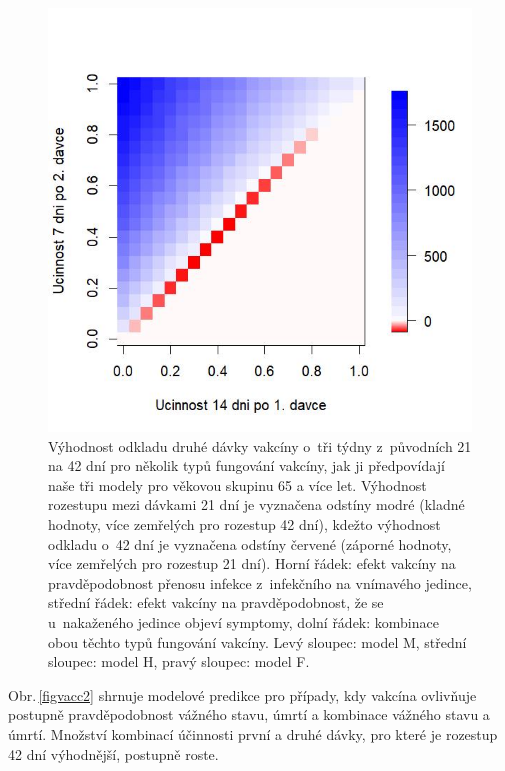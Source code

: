\begin{figure}[ht]
\begin{center}
\begin{minipage}[m]{0.3\linewidth}
		\end{minipage}
		\begin{minipage}[m]{0.3\linewidth}
			\includegraphics[width=\textwidth]{pic/SAM_DIFF_mean_T.jpg}
		\end{minipage}
	\end{center}
	\caption{Výhodnost odkladu druhé dávky vakcíny o~tři týdny z~původních 21 na 42 dní pro několik typů fungování vakcíny, jak ji předpovídají naše tři modely pro věkovou skupinu 65 a více let. Výhodnost rozestupu mezi dávkami 21 dní je vyznačena odstíny modré (kladné hodnoty, více zemřelých pro rozestup 42 dní), kdežto výhodnost odkladu o~42 dní je vyznačena odstíny červené (záporné hodnoty, více zemřelých pro rozestup 21 dní). Horní řádek: efekt vakcíny na pravděpodobnost přenosu infekce z~infekčního na vnímavého jedince, střední řádek: efekt vakcíny na pravděpodobnost, že se u~nakaženého jedince objeví symptomy, dolní řádek: kombinace obou těchto typů fungování vakcíny. Levý sloupec: model M, střední sloupec: model H, pravý sloupec: model F.}
	\label{figvacc1}
\end{figure}
 
Obr.\,\ref{figvacc2} shrnuje modelové predikce pro případy, kdy vakcína ovlivňuje postupně pravděpodobnost vážného stavu, úmrtí a kombinace vážného stavu a úmrtí. Množství kombinací účinnosti první a druhé dávky, pro které je rozestup 42 dní výhodnější, postupně roste.
 
